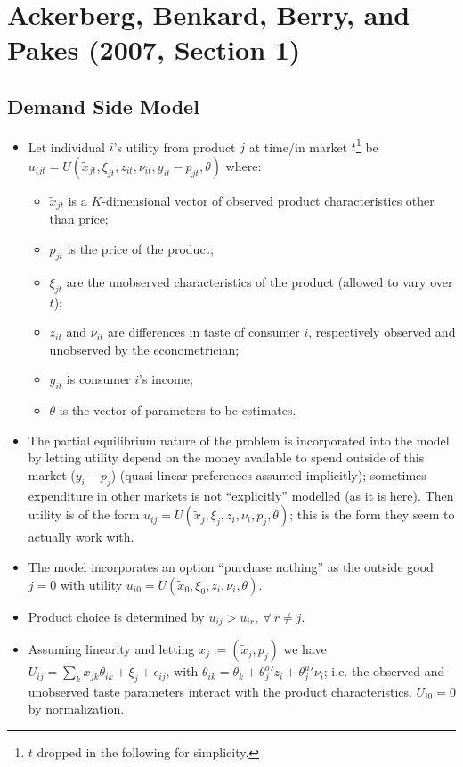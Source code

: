 \documentclass[11pt]{article}
\numberwithin{equation}{section}
\begin{document}
\section{Ackerberg, Benkard, Berry, and Pakes (2007, Section 1)}
\subsection{Demand Side Model}
	\begin{itemize}
	\item Let individual $i$'s utility from product $j$ at time/in market $t$\footnote{$t$ dropped in the following for simplicity.} be $u_{ijt} = U(\tilde{x}_{jt}, \xi_{jt}, z_{it}, \nu_{it}, y_{it} - p_{jt}, \theta)$ where:
	\begin{itemize}
		\item $\tilde{x}_{jt}$ is a $K$-dimensional vector of observed product characteristics other than price;
		\item $p_{jt}$ is the price of the product;
		\item $\xi_{jt}$ are the unobserved characteristics of the product (allowed to vary over $t$);
		\item $z_{it}$ and $\nu_{it}$ are differences in taste of consumer $i$, respectively observed and unobserved by the econometrician;
		\item $y_{it}$ is consumer $i$'s income;
		\item $\theta$ is the vector of parameters to be estimates.
	\end{itemize}
	\item The partial equilibrium nature of the problem is incorporated into the model
	by letting utility depend on the money available to spend outside of this market ($y_{i} - p_{j}$) (quasi-linear preferences assumed implicitly); sometimes expenditure in other markets is not ``explicitly'' modelled (as it is here). Then utility is of the form $u_{ij} = U(\tilde{x}_{j}, \xi_{j}, z_{i}, \nu_{i}, p_{j}, \theta)$; this is the form they seem to actually work with.
	\item The model incorporates an option ``purchase nothing'' as the outside good $j=0$ with utility $u_{i0} = U(\tilde{x}_{0}, \xi_{0}, z_{i}, \nu_{i}, \theta)$.
	\item Product choice is determined by $u_{ij}>u_{ir},~\forall~ r \neq j$.
	\item Assuming linearity and letting $x_j := (\tilde{x}_j, p_j)$ we have $U_{ij} = \sum_{k}x_{jk}\theta_{ik} + \xi_j + \epsilon_{ij}$, with $\theta_{ik} = \bar{\theta}_k + \theta_j^o\prime z_i + \theta_j^u\prime \nu_i$; i.e. the observed and unobserved taste parameters interact with the product characteristics. $U_{i0}=0$ by normalization.

\end{itemize}
\end{document}
